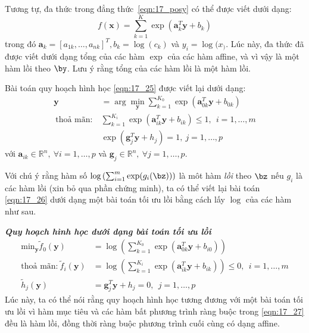 Tương tự, đa thức trong đẳng thức~\eqref{eqn:17_posy} có thể
được viết dưới dạng:
\begin{equation*} 
f(\mathbf{x}) = \sum_{k = 1}^K \exp(\mathbf{a}_k^T\mathbf{y} + b_k) 
\end{equation*} 
trong đó $\mathbf{a}_k = [a_{1k}, \dots, a_{nk}]^T, b_k = \log(c_k)$ và $y_i =
\log(x_)$. Lúc này, đa thức đã được viết dưới dạng tổng của các hàm
$\exp$ của các hàm {affine}, và vì vậy là một hàm lồi theo $\by$. Lưu ý rằng tổng của các hàm lồi là một hàm lồi.

Bài toán quy hoạch hình học \eqref{eqn:17_25} được viết lại dưới dạng:  
\begin{equation} 
\label{eqn:17_26}
\begin{aligned}
    \mathbf{y} &= \arg\min_{\mathbf{y}} \sum_{k=1}^{K_0}
    \exp(\mathbf{a}_{0k}^T\mathbf{y} + b_{0k})                      \\\ 
\text{thoả mãn:}~ & \sum_{k=1}^{K_i} \exp(\mathbf{a}_{ik}^T\mathbf{y} + b_{ik}) \leq 1, ~~i = 1, \dots, m\\\ 
& \exp(\mathbf{g}_j^T\mathbf{y} + h_j) = 1, ~ j= 1, \dots, p 
    \end{aligned}
\end{equation} 
với $\mathbf{a}_{ik} \in \mathbb{R}^n,~\forall i = 1, \dots, p$ và $\mathbf{g}_j
\in
\mathbb{R}^n,~\forall j = 1, \dots, p$. 
 
Với chú ý rằng hàm số $\log \left(\sum_{i=1}^m
\exp(g_i(\mathbf{\bz}))\right)$ là môt hàm \textit{lồi} theo $\bz$ nếu $g_i$ là
các hàm {lồi} (xin bỏ qua phần chứng minh), ta có thể viết lại bài
toán \eqref{eqn:17_26} dưới dạng một bài toán tối ưu lồi bằng cách lấy $\log$ của các hàm như sau.

\textbf{\textit{{Quy hoạch hình học dưới dạng bài toán tối ưu lồi}}}
\begin{equation} 
 \label{eqn:17_27}
 \begin{aligned}
    \text{min}_{\mathbf{y}} \tilde{f}_0(\mathbf{y}) &= \log\left(\sum_{k=1}^{K_0} \exp(\mathbf{a}_{0k}^T \mathbf{y} + b_{i0})\right) \\
\text{thoả mãn:}~ \tilde{f}_i(\mathbf{y}) &= \log \left(\sum_{k=1}^{K_i} \exp(\mathbf{a}_{ik}^T \mathbf{y} + b_{ik})\right) \leq 0, ~~ i = 1, \dots, m \\ 
\tilde{h}_j(\mathbf{y}) &= \mathbf{g}_j^T\mathbf{y} + h_j = 0,~~ j = 1, \dots, p
 \end{aligned}
\end{equation} 
Lúc này, ta có thể nói rằng quy hoạch hình học tương đương với một bài toán tối ưu lồi vì hàm
mục tiêu và các hàm bất phương trình ràng buộc trong \eqref{eqn:17_27} đều là hàm
lồi, đồng thời ràng buộc phương trình cuối cùng có dạng {affine}. 
 
